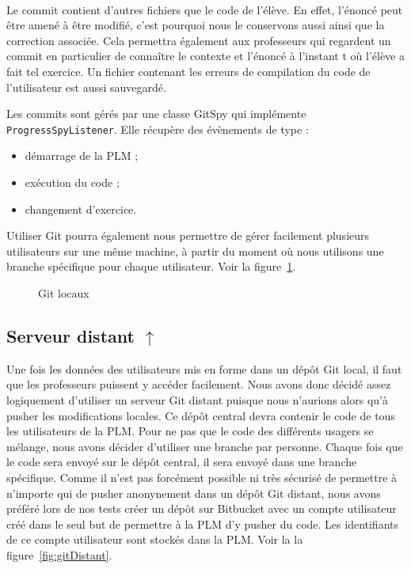 $ $

Le commit contient d'autres fichiers que le code de l'élève. En effet, l'énoncé peut être amené à être modifié, c'est pourquoi nous le conservons aussi ainsi que la correction associée. Cela permettra également aux professeurs qui regardent un commit en particulier de connaître le contexte et l'énoncé à l'instant t où l'élève a fait tel exercice. 
Un fichier contenant les erreurs de compilation du code de l'utilisateur est aussi sauvegardé.


Les commits sont gérés par une classe GitSpy qui implémente \texttt{ProgressSpyListener}. Elle récupère des évènements de type :
\begin{itemize}
\item démarrage de la PLM ;
\item exécution du code ;
\item changement d'exercice.
\end{itemize}

Utiliser Git pourra également nous permettre de gérer facilement plusieurs utilisateurs sur une même machine, à partir du moment où nous utilisons une branche spécifique pour chaque utilisateur. Voir la figure~\ref{gitLocal}.

\begin{figure}[!h]
\begin{center}
	
    \caption{Git locaux}
    \label{gitLocal}
\end{center}
\end{figure}

\subsection[Serveur distant]{Serveur distant \hyperref[serveurDistantPb]{$\uparrow$}}
\label{serveurDistantSol}

Une fois les données des utilisateurs mis en forme dans un dépôt Git local, il faut que les professeurs puissent y accéder facilement. Nous avons donc décidé assez logiquement d'utiliser un serveur Git distant puisque nous n'aurions alors qu'à pusher les modifications locales. Ce dépôt central devra contenir le code de tous les utilisateurs de la PLM. Pour ne pas que le code des différents usagers se mélange, nous avons décider d'utiliser une branche par personne. Chaque fois que le code sera envoyé sur le dépôt central, il sera envoyé dans une branche spécifique. Comme il n'est pas forcément possible ni très sécurisé de permettre à n'importe qui de pusher anonynement dans un dépôt Git distant, nous avons préféré lors de nos tests créer un dépôt sur Bitbucket\cite{depotBitbucket} avec un compte utilisateur créé dans le seul but de permettre à la PLM d'y pusher du code. Les identifiants de ce compte utilisateur sont stockés dans la PLM. Voir la la figure~\ref{fig:gitDistant}.

